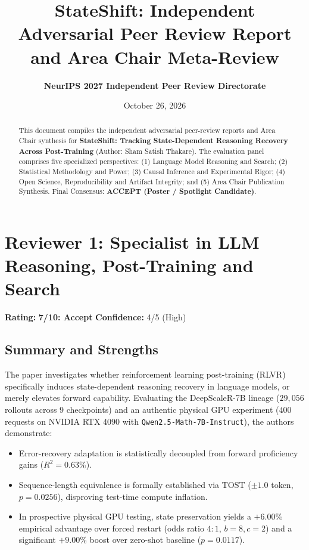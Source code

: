 \documentclass[11pt]{article}
\title{\textbf{StateShift: Independent Adversarial Peer Review Report\\and Area Chair Meta-Review}}
\author{\textbf{NeurIPS 2027 Independent Peer Review Directorate}}
\date{October 26, 2026}
\begin{document}
\maketitle

\begin{abstract}
This document compiles the independent adversarial peer-review reports and Area Chair synthesis for \textbf{StateShift: Tracking State-Dependent Reasoning Recovery Across Post-Training} (Author: Sham Satish Thakare). The evaluation panel comprises five specialized perspectives: (1) Language Model Reasoning and Search; (2) Statistical Methodology and Power; (3) Causal Inference and Experimental Rigor; (4) Open Science, Reproducibility and Artifact Integrity; and (5) Area Chair Publication Synthesis. Final Consensus: \textbf{ACCEPT (Poster / Spotlight Candidate)}.
\end{abstract}

\section*{Reviewer 1: Specialist in LLM Reasoning, Post-Training and Search}
\textbf{Rating:} \textbf{7/10: Accept} \quad \textbf{Confidence:} 4/5 (High)

\subsection*{Summary and Strengths}
The paper investigates whether reinforcement learning post-training (RLVR) specifically induces state-dependent reasoning recovery in language models, or merely elevates forward capability. Evaluating the DeepScaleR-7B lineage ($29,056$ rollouts across 9 checkpoints) and an authentic physical GPU experiment ($400$ requests on NVIDIA RTX 4090 with \texttt{Qwen2.5-Math-7B-Instruct}), the authors demonstrate:
\begin{itemize}
    \item Error-recovery adaptation is statistically decoupled from forward proficiency gains ($R^2 = 0.63\%$).
    \item Sequence-length equivalence is formally established via TOST ($\pm 1.0$ token, $p = 0.0256$), disproving test-time compute inflation.
    \item In prospective physical GPU testing, state preservation yields a $+6.00\%$ empirical advantage over forced restart (odds ratio $4:1$, $b=8, c=2$) and a significant $+9.00\%$ boost over zero-shot baseline ($p = 0.0117$).
\end{itemize}
\end{document}
